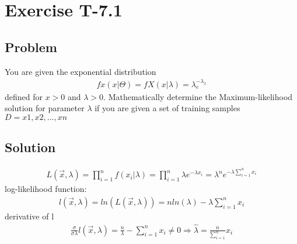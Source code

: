 \section*{Exercise T-7.1}

\subsection*{Problem}
You are given the exponential distribution\\
\begin{align}
fx (x|\Theta) = fX (x|\lambda) = \lambda_e^{−\lambda_x} \nonumber
\end{align}
defined for $x > 0$ and $\lambda > 0$. Mathematically determine the Maximum-likelihood solution for parameter $\lambda$ if you are given a set of training samples $D = x1 , x2 , ..., xn $

\subsection*{Solution}
\begin{align}
L(\overrightarrow{x},\lambda) = \prod_{i=1}^{n}f(x_i | \lambda)=\prod_{i=1}^{n}\lambda e^{-\lambda x_i}=\lambda^n e^{-\lambda \sum_{i=1}^{n} x_i}
\end{align}
log-likelihood function:
\begin{align}
l(\overrightarrow{x},\lambda)=ln(L(\overrightarrow{x},\lambda))=nln(\lambda)-\lambda \sum_{i=1}^{n}x_i
\end{align}
derivative of l
\begin{align}
\frac{\sigma}{\sigma\lambda}l(\overrightarrow{x},\lambda)=\frac{n}{\lambda}-\sum_{i=1}^{n}x_i\ne 0 \Rightarrow \hat{\lambda}=\frac{n}{\sum_{i=1}^{n}}x_i
\end{align}